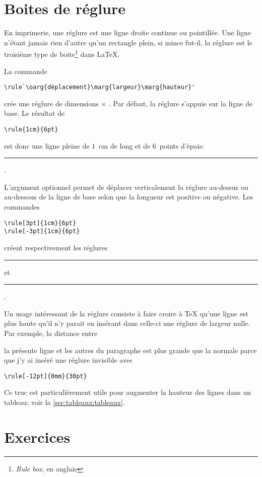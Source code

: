 \section{Boites de réglure}
\label{sec:boites:rulebox}

En imprimerie, une réglure est une ligne droite continue ou
pointillée. Une ligne n'étant jamais rien d'autre qu'un rectangle
plein, si mince fut-il, la réglure est le troisième type de
boite\footnote{%
  \emph{Rule box}, en anglais} %
dans {\LaTeX}.

La commande
\begin{lstlisting}
\rule`\oarg{déplacement}\marg{largeur}\marg{hauteur}'
\end{lstlisting}
crée une réglure de dimensions  $\times$ .
Par défaut, la réglure s'appuie sur la ligne de base. Le résultat de
\begin{lstlisting}
\rule{1cm}{6pt}
\end{lstlisting}
est donc une ligne pleine de $1$~cm de long et de $6$~points d'épais:
\rule{1cm}{6pt}.

L'argument optionnel  permet de déplacer
verticalement la réglure au-dessus ou au-dessous de la ligne de base
selon que la longueur  est positive ou négative. Les
commandes
\begin{lstlisting}
\rule[3pt]{1cm}{6pt}
\rule[-3pt]{1cm}{6pt}
\end{lstlisting}
créent respectivement les réglures \rule[3pt]{1cm}{6pt} et
\rule[-3pt]{1cm}{6pt}.

Un usage intéressant de la réglure consiste à faire croire à {\TeX}
qu'une ligne est plus haute qu'il n'y parait en insérant dans celle-ci
une réglure de largeur nulle. Par exemple, la distance entre
\rule[-12pt]{0mm}{30pt}\relax la présente ligne et les autres du
paragraphe est plus grande que la normale parce que j'y ai inséré une
réglure invisible avec
\begin{lstlisting}
\rule[-12pt]{0mm}{30pt}
\end{lstlisting}
Ce truc est particulièrement utile pour augmenter la hauteur des
lignes dans un tableau; voir la \autoref{sec:tableaux:tableaux}.




\section{Exercices}
\label{sec:boites:exercices}

